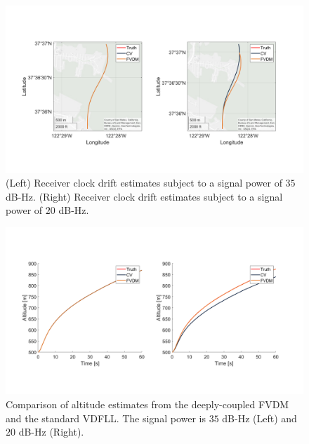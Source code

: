 \begin{figure}[!ht]
    \centering
    \includegraphics[width=\linewidth]{Figures/resultsv2/Slide5.PNG}
    \caption{(Left) Receiver clock drift estimates subject to a signal power of \(35\) dB-Hz. (Right) Receiver clock drift estimates subject to a signal power of \(20\) dB-Hz.}\label{fig:clockerror451}
\end{figure}

\begin{figure}[!ht]
    \centering
    \includegraphics[width=\linewidth]{Figures/resultsv2/Slide11.PNG}
    \caption{Comparison of altitude estimates from the deeply-coupled FVDM and the standard VDFLL\@. The signal power is \(35\) dB-Hz (Left) and \(20\) dB-Hz (Right).}\label{fig:fixthis4}
\end{figure}

